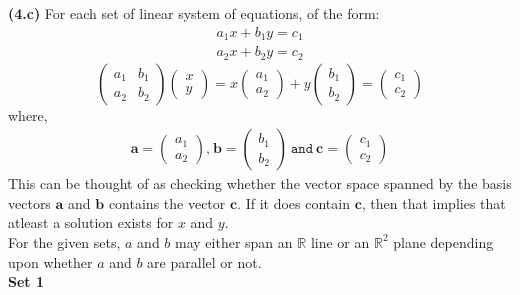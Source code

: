 \documentclass[12pt,letterpaper,fleqn]{article}
\theoremstyle{definition}
\begin{document}
\textbf{(4.c)} For each set of linear system of equations, of the form:
\begin{equation*}
\begin{split}
a_1x + b_1y = c_1\\
a_2x + b_2y = c_2
\end{split}
\end{equation*}
\begin{equation*}
\begin{pmatrix}
a_1 &b_1\\
a_2 &b_2
\end{pmatrix}
\begin{pmatrix}
x\\
y
\end{pmatrix} = x
\begin{pmatrix}
a_1\\
a_2
\end{pmatrix}
+ y
\begin{pmatrix}
b_1\\
b_2
\end{pmatrix} =
\begin{pmatrix}
c_1\\
c_2
\end{pmatrix}
\end{equation*}
where,
\begin{equation*}
\begin{split}
\textbf{a} = 
\begin{pmatrix}
a_1\\
a_2
\end{pmatrix} \texttt{,}~
\textbf{b} = 
\begin{pmatrix}
b_1\\
b_2
\end{pmatrix}~ \texttt{and}~
\textbf{c} = 
\begin{pmatrix}
c_1\\
c_2
\end{pmatrix}
\end{split}
\end{equation*}
This can be thought of as checking whether the vector space spanned by the basis vectors $\textbf{a}$ and $\textbf{b}$ contains the vector $\textbf{c}$. If it does contain $\textbf{c}$, then that implies that atleast a solution exists for $x$ and $y$.\\
For the given sets, $a$ and $b$ may either span an $\mathbb{R}$ line or an $\mathbb{R}^{2}$ plane depending upon whether $a$ and $b$ are parallel or not.\\
\textbf{Set 1}\\
\end{document}
